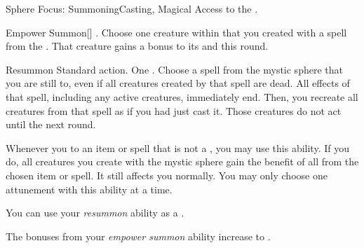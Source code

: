   \begin{magicalfeat}{Sphere Focus: Summoning}{Casting, Magical}
    \featpre Access to the  .

    \begin{magicalactiveability}{Empower Summon}[]
      \abilityusagetime {}.
      \rankline
      Choose one creature within \medrange that you created with a spell from the  .
      That creature gains a  bonus to its  and  this round.
    \end{magicalactiveability}

    \begin{magicalactiveability}{Resummon}
      \abilityusagetime Standard action.
      \abilitycost One .
      \rankline
      Choose a spell from the  mystic sphere that you are still  to, even if all creatures created by that spell are dead.
      All effects of that spell, including any active creatures, immediately end.
      Then, you recreate all creatures from that spell as if you had just cast it.
      Those creatures do not act until the next round.
    \end{magicalactiveability}

     Whenever you  to an item or spell that is not a , you may use this ability.
    If you do, all creatures you create with the  mystic sphere gain the benefit of all  from the chosen item or spell.
    It still affects you normally.
    You may only choose one attunement with this ability at a time.

     You can use your \textit{resummon} ability as a .

     The bonuses from your \textit{empower summon} ability increase to .
  \end{magicalfeat}

